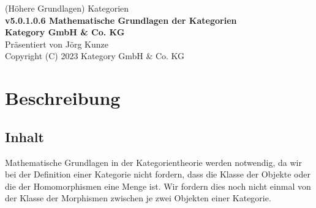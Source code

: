 \documentclass[a4paper]{amsart}
\theoremstyle{definition}
\begin{document}
\begin{titlepage}
\centering
{\huge
(Höhere Grundlagen) Kategorien\\[1cm]
\textbf{v5.0.1.0.6 Mathematische Grundlagen der Kategorien}
}\\[1cm]

\textbf{Kategory GmbH \& Co. KG}\\
Präsentiert von Jörg Kunze\\
Copyright (C) 2023 Kategory GmbH \& Co. KG

\end{titlepage}

%

\newpage

\section*{Beschreibung}

\subsection*{Inhalt}
Mathematische Grundlagen in der Kategorientheorie werden notwendig, da wir bei der Definition einer Kategorie nicht fordern, dass die Klasse der Objekte oder die der Homomorphismen eine Menge ist. Wir fordern dies noch nicht einmal von der Klasse der Morphismen zwischen je zwei Objekten einer Kategorie.
\end{document}
